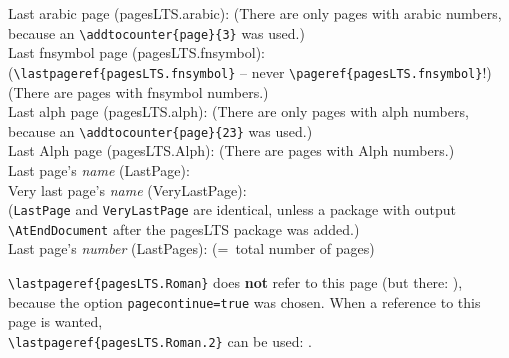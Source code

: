 \documentclass[british]{article}
\def\pagesLTSexampleArabic{3}
\def\pagesLTSexamplealph{23}
\begin{document}
\noindent Last arabic page (pagesLTS.arabic): 
(There are only  pages with arabic numbers,
because an \texttt{\textbackslash addtocounter\{page\}\{\pagesLTSexampleArabic\}} was used.)\\

\noindent Last fnsymbol page (pagesLTS.fnsymbol):  \\
(\texttt{\textbackslash lastpageref\{pagesLTS.fnsymbol\}} -- never
\texttt{\textbackslash pageref\{pagesLTS.fnsymbol\}}!)\\
(There are  pages with fnsymbol numbers.)\\

\noindent Last alph page (pagesLTS.alph): 
(There are only  pages with alph numbers,
because an \texttt{\textbackslash addtocounter\{page\}\{\pagesLTSexamplealph\}} was used.)\\

\noindent Last Alph page (pagesLTS.Alph): 
(There are  pages with Alph numbers.)\\

\noindent Last page's \textit{name} (LastPage): \\

\noindent Very last page's \textit{name} (VeryLastPage): \\
(\texttt{LastPage} and \texttt{VeryLastPage} are identical, unless
a package with output \linebreak
\texttt{\textbackslash AtEndDocument} after the \textsf{pagesLTS} package
was added.)\\

\noindent Last page's \textit{number} (LastPages): 
(=~total number of pages)\\

\lipsum[1-6]

\newpage

\texttt{\textbackslash lastpageref\{pagesLTS.Roman\}} does \textbf{not}
refer to this page (but there: ),
because the option \texttt{pagecontinue=true}
was chosen. When a reference to this page is wanted,\\
\texttt{\textbackslash lastpageref\{pagesLTS.Roman.2\}}
can be used: .\\
\end{document}
